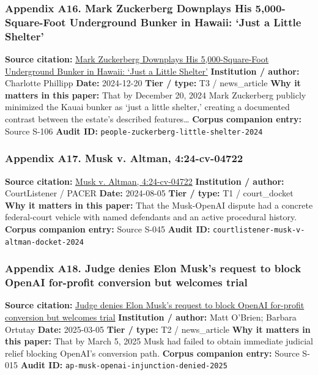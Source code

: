 \documentclass[
  american,
  11pt,
  letterpaper,
]{article}
\begin{document}
\subsubsection{Appendix A16. Mark Zuckerberg Downplays His
5,000-Square-Foot Underground Bunker in Hawaii: `Just a Little
Shelter'}\label{ch-08-appendix-a16-mark-zuckerberg-downplays-his-5-000-square-foot-underground-bunker-in-hawaii-just-a-little-shelter}

\textbf{Source citation:}
\href{https://people.com/mark-zuckerberg-hawaii-bunker-5000-square-feet-8765376}{Mark
Zuckerberg Downplays His 5,000-Square-Foot Underground Bunker in Hawaii:
`Just a Little Shelter'} \textbf{Institution / author:} Charlotte
Phillipp \textbf{Date:} 2024-12-20 \textbf{Tier / type:} T3 /
news\_article \textbf{Why it matters in this paper:} That by December
20, 2024 Mark Zuckerberg publicly minimized the Kauai bunker as `just a
little shelter,' creating a documented contrast between the estate's
described features\ldots{} \textbf{Corpus companion entry:} Source S-106
\textbf{Audit ID:} \texttt{people-zuckerberg-little-shelter-2024}

\subsubsection{Appendix A17. Musk v. Altman,
4:24-cv-04722}\label{ch-08-appendix-a17-musk-v-altman-4-24-cv-04722}

\textbf{Source citation:}
\href{https://www.courtlistener.com/docket/69013420/musk-v-altman/}{Musk
v. Altman, 4:24-cv-04722} \textbf{Institution / author:} CourtListener /
PACER \textbf{Date:} 2024-08-05 \textbf{Tier / type:} T1 / court\_docket
\textbf{Why it matters in this paper:} That the Musk-OpenAI dispute had
a concrete federal-court vehicle with named defendants and an active
procedural history. \textbf{Corpus companion entry:} Source S-045
\textbf{Audit ID:} \texttt{courtlistener-musk-v-altman-docket-2024}

\subsubsection{Appendix A18. Judge denies Elon Musk's request to block
OpenAI for-profit conversion but welcomes
trial}\label{ch-08-appendix-a18-judge-denies-elon-musk-s-request-to-block-openai-for-profit-conversion-but-welcomes-trial}

\textbf{Source citation:}
\href{https://apnews.com/article/elon-musk-openai-lawsuit-f5724e7ab07b5bed8292a1e8aa2ef695}{Judge
denies Elon Musk's request to block OpenAI for-profit conversion but
welcomes trial} \textbf{Institution / author:} Matt O'Brien; Barbara
Ortutay \textbf{Date:} 2025-03-05 \textbf{Tier / type:} T2 /
news\_article \textbf{Why it matters in this paper:} That by March 5,
2025 Musk had failed to obtain immediate judicial relief blocking
OpenAI's conversion path. \textbf{Corpus companion entry:} Source S-015
\textbf{Audit ID:} \texttt{ap-musk-openai-injunction-denied-2025}
\end{document}
